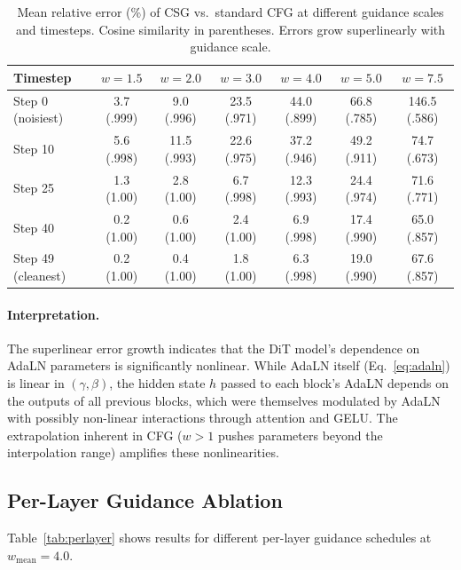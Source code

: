 \documentclass{article}
\newcommand{\adaln}{AdaLN}
\begin{document}
\begin{table}[t]
\caption{Mean relative error (\%) of CSG vs.\ standard CFG at different guidance scales and timesteps. Cosine similarity in parentheses. Errors grow superlinearly with guidance scale.}
\label{tab:linearity}
\centering\small
\begin{tabular}{lcccccc}
\toprule
Timestep & $w{=}1.5$ & $w{=}2.0$ & $w{=}3.0$ & $w{=}4.0$ & $w{=}5.0$ & $w{=}7.5$ \\
\midrule
Step 0 (noisiest) & 3.7 (.999) & 9.0 (.996) & 23.5 (.971) & 44.0 (.899) & 66.8 (.785) & 146.5 (.586) \\
Step 10 & 5.6 (.998) & 11.5 (.993) & 22.6 (.975) & 37.2 (.946) & 49.2 (.911) & 74.7 (.673) \\
Step 25 & 1.3 (1.00) & 2.8 (1.00) & 6.7 (.998) & 12.3 (.993) & 24.4 (.974) & 71.6 (.771) \\
Step 40 & 0.2 (1.00) & 0.6 (1.00) & 2.4 (1.00) & 6.9 (.998) & 17.4 (.990) & 65.0 (.857) \\
Step 49 (cleanest) & 0.2 (1.00) & 0.4 (1.00) & 1.8 (1.00) & 6.3 (.998) & 19.0 (.990) & 67.6 (.857) \\
\bottomrule
\end{tabular}
\end{table}

\paragraph{Interpretation.}
The superlinear error growth indicates that the DiT model's dependence on \adaln{} parameters is significantly nonlinear. While \adaln{} itself (Eq.~\ref{eq:adaln}) is linear in $(\gamma, \beta)$, the hidden state $h$ passed to each block's \adaln{} depends on the outputs of all previous blocks, which were themselves modulated by \adaln{} with possibly non-linear interactions through attention and GELU. The extrapolation inherent in CFG ($w > 1$ pushes parameters beyond the interpolation range) amplifies these nonlinearities.

\subsection{Per-Layer Guidance Ablation}

Table~\ref{tab:perlayer} shows results for different per-layer guidance schedules at $w_{\text{mean}} = 4.0$.
\end{document}
